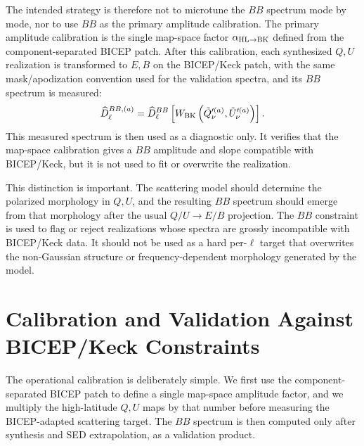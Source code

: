 \documentclass[11pt]{article}
\begin{document}
The intended strategy is therefore not to microtune the $BB$ spectrum mode by
mode, nor to use $BB$ as the primary amplitude calibration.  The primary
amplitude calibration is the single map-space factor
$\alpha_{\rm HL\to BK}$ defined from the component-separated BICEP patch.
After this calibration, each synthesized $Q,U$ realization is transformed to
$E,B$ on the BICEP/Keck patch, with the same mask/apodization convention used
for the validation spectra, and its $BB$ spectrum is measured:
\[
  \widehat D_\ell^{BB,(a)}
  =
  \widehat D_\ell^{BB}
  \left[
    W_{\rm BK}
    \left(
      \tilde Q_{\nu}^{\prime(a)},
      \tilde U_{\nu}^{\prime(a)}
    \right)
  \right].
\]
This measured spectrum is then used as a diagnostic only.  It verifies that
the map-space calibration gives a $BB$ amplitude and slope compatible with
BICEP/Keck, but it is not used to fit or overwrite the realization.

This distinction is important.  The scattering model should determine the
polarized morphology in $Q,U$, and the resulting $BB$ spectrum should emerge
from that morphology after the usual $Q/U\rightarrow E/B$ projection.  The
$BB$ constraint is used to flag or reject realizations whose spectra are
grossly incompatible with BICEP/Keck data.  It should not be used as a hard
per-$\ell$ target that overwrites the non-Gaussian structure or
frequency-dependent morphology generated by the model.

\section{Calibration and Validation Against BICEP/Keck Constraints}

The operational calibration is deliberately simple.  We first use the
component-separated BICEP patch to define a single map-space amplitude factor,
and we multiply the high-latitude $Q,U$ maps by that number before measuring
the BICEP-adapted scattering target.  The $BB$ spectrum is then computed only
after synthesis and SED extrapolation, as a validation product.
\end{document}
